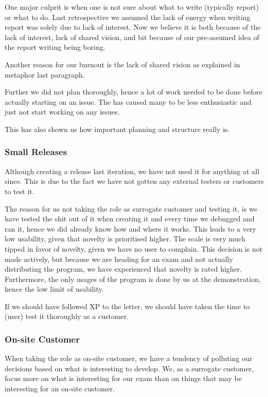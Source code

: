 One major culprit is when one is not sure about what to write (typically report) or what to do.
Last retrospective we assumed the lack of energy when writing report was solely due to lack of interest. Now we believe it is both because of the lack of interest, lack of shared vision, and bit because of our pre-assumed idea of the report writing being boring.

Another reason for our burnout is the lack of shared vision as explained in metaphor last paragraph.

Further we did not plan thoroughly, hence a lot of work needed to be done before actually starting on an issue. The has caused many to be less enthusiastic and just not start working on any issues.

This has also shown us how important planning and structure really is.


\subsubsection{Small Releases}
Although creating a release last iteration, we have not used it for anything at all since. This is due to the fact we have not gotten any external testers or customers to test it.

The reason for us not taking the role as surrogate customer and testing it, is we have tested the shit out of it when creating it and every time we debugged and ran it, hence we did already know how and where it works.\linebreak
This leads to a very low usability, given that novelty is prioritised higher. The scale is very much tipped in favor of novelty, given we have no user to complain.\linebreak 
This decision is not made actively, but because we are heading for an exam and not actually distributing the program, we have experienced that novelty is rated higher.\linebreak
Furthermore, the only usages of the program is done by us at the demonstration, hence the low limit of usability.

If we should have followed XP to the letter, we should have taken the time to (user) test it thoroughly as a customer.

\subsubsection{On-site Customer}
When taking the role as on-site customer, we have a tendency of polluting our decisions based on what is interesting to develop. We, as a surrogate customer, focus more on what is interesting for our exam than on things that may be interesting for an on-site customer.


